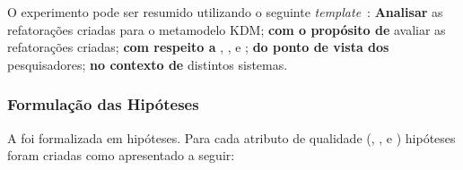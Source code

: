 O experimento pode ser resumido utilizando o seguinte \textit{template}~\cite{Wohlin}: \textbf{Analisar} as refatorações criadas para o metamodelo KDM; \textbf{com o propósito de} avaliar as refatorações criadas; \textbf{com respeito a} , ,  e ; \textbf{do ponto de vista dos} pesquisadores; \textbf{no contexto de} distintos sistemas.

\subsubsection{Formulação das Hipóteses}



A  foi formalizada em hipóteses. Para cada atributo de qualidade (, ,  e ) hipóteses foram criadas como apresentado a seguir:


